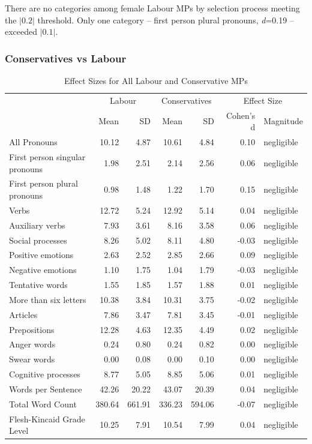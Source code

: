 \documentclass[]{article}
\theoremstyle{definition}
\theoremstyle{definition}
\theoremstyle{definition}
\theoremstyle{remark}
\begin{document}
There are no categories among female Labour MPs by selection process
meeting the \(|0.2|\) threshold. Only one category -- first person
plural pronouns, \emph{d}=0.19 -- exceeded \(|0.1|\).

\hypertarget{conservatives-vs-labour}{%
\subsubsection{Conservatives vs Labour}\label{conservatives-vs-labour}}

\begin{table}[H]

\caption{\label{tab:tory-labour-effect-sizes-table}Effect Sizes for All Labour and Conservative MPs}
\centering
\begin{tabular}[t]{lrrrrrl}
\toprule
\multicolumn{1}{c}{ } & \multicolumn{2}{c}{Labour} & \multicolumn{2}{c}{Conservatives} & \multicolumn{2}{c}{Effect Size} \\
\cmidrule(l{2pt}r{2pt}){2-3} \cmidrule(l{2pt}r{2pt}){4-5} \cmidrule(l{2pt}r{2pt}){6-7}
 & Mean & SD & Mean & SD & Cohen's d & Magnitude\\
\midrule
All Pronouns & 10.12 & 4.87 & 10.61 & 4.84 & 0.10 & negligible\\
First person singular pronouns & 1.98 & 2.51 & 2.14 & 2.56 & 0.06 & negligible\\
First person plural pronouns & 0.98 & 1.48 & 1.22 & 1.70 & 0.15 & negligible\\
Verbs & 12.72 & 5.24 & 12.92 & 5.14 & 0.04 & negligible\\
Auxiliary verbs & 7.93 & 3.61 & 8.16 & 3.58 & 0.06 & negligible\\
\addlinespace
Social processes & 8.26 & 5.02 & 8.11 & 4.80 & -0.03 & negligible\\
Positive emotions & 2.63 & 2.52 & 2.85 & 2.66 & 0.09 & negligible\\
Negative emotions & 1.10 & 1.75 & 1.04 & 1.79 & -0.03 & negligible\\
Tentative words & 1.55 & 1.85 & 1.57 & 1.88 & 0.01 & negligible\\
More than six letters & 10.38 & 3.84 & 10.31 & 3.75 & -0.02 & negligible\\
\addlinespace
Articles & 7.86 & 3.47 & 7.81 & 3.45 & -0.01 & negligible\\
Prepositions & 12.28 & 4.63 & 12.35 & 4.49 & 0.02 & negligible\\
Anger words & 0.24 & 0.80 & 0.24 & 0.82 & 0.00 & negligible\\
Swear words & 0.00 & 0.08 & 0.00 & 0.10 & 0.00 & negligible\\
Cognitive processes & 8.77 & 5.05 & 8.85 & 5.06 & 0.01 & negligible\\
\addlinespace
Words per Sentence & 42.26 & 20.22 & 43.07 & 20.39 & 0.04 & negligible\\
Total Word Count & 380.64 & 661.91 & 336.23 & 594.06 & -0.07 & negligible\\
Flesh-Kincaid Grade Level & 10.25 & 7.91 & 10.54 & 7.99 & 0.04 & negligible\\
\bottomrule
\end{tabular}
\end{table}
\end{document}
